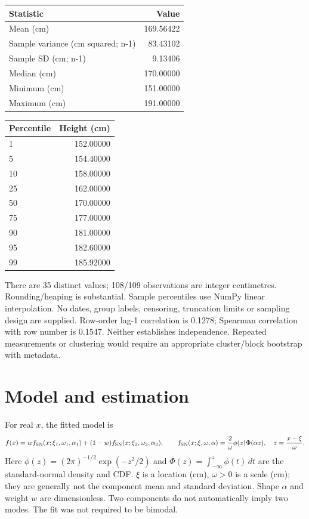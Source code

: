 \documentclass[11pt,a4paper]{article}
\begin{document}
\begin{center}
\small
\begin{tabular}{lr}
\toprule
Statistic & Value\\
\midrule
Mean (cm) & 169.56422\\
Sample variance (cm squared; n-1) & 83.43102\\
Sample SD (cm; n-1) & 9.13406\\
Median (cm) & 170.00000\\
Minimum (cm) & 151.00000\\
Maximum (cm) & 191.00000\\
\bottomrule
\end{tabular}
\end{center}
\begin{center}
\small
\begin{tabular}{lr}
\toprule
Percentile & Height (cm)\\
\midrule
1 & 152.00000\\
5 & 154.40000\\
10 & 158.00000\\
25 & 162.00000\\
50 & 170.00000\\
75 & 177.00000\\
90 & 181.00000\\
95 & 182.60000\\
99 & 185.92000\\
\bottomrule
\end{tabular}
\end{center}
There are 35 distinct values; 108/109 observations are integer centimetres. Rounding/heaping is substantial. Sample percentiles use NumPy linear interpolation. No dates, group labels, censoring, truncation limits or sampling design are supplied. Row-order lag-1 correlation is 0.1278; Spearman correlation with row number is 0.1547. Neither establishes independence. Repeated measurements or clustering would require an appropriate cluster/block bootstrap with metadata.

\clearpage
\section*{Model and estimation}
For real $x$, the fitted model is
\[
 f(x)=w f_{\rm SN}(x;\xi_1,\omega_1,\alpha_1)
 +(1-w)f_{\rm SN}(x;\xi_2,\omega_2,\alpha_2),\qquad
 f_{\rm SN}(x;\xi,\omega,\alpha)=\frac{2}{\omega}\phi(z)\Phi(\alpha z),
 \quad z=\frac{x-\xi}{\omega}.
\]
Here $\phi(z)=(2\pi)^{-1/2}\exp(-z^2/2)$ and
$\Phi(z)=\int_{-\infty}^z\phi(t)\,dt$ are the standard-normal density and CDF.
$\xi$ is a location (cm), $\omega>0$ is a scale (cm); they are generally
not the component mean and standard deviation. Shape $\alpha$ and weight $w$
are dimensionless. Two components do not automatically imply two modes.
The fit was not required to be bimodal.
\end{document}
